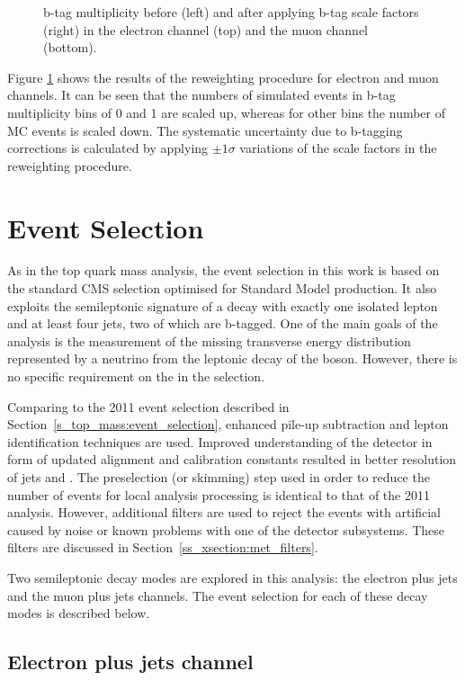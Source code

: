 \begin{figure}[!htpb]
	\caption{\label{fig:bjet_weights}
    b-tag multiplicity before (left) and after applying b-tag scale factors (right) in the electron channel (top) and
    the muon channel (bottom).}
\end{figure}

Figure \ref{fig:bjet_weights} shows the results of the reweighting procedure for electron and muon channels. It can be
seen that the numbers of simulated events in b-tag multiplicity bins of \num{0} and \num{1} are scaled up, whereas for
other bins the number of MC events is scaled down. The systematic uncertainty due to b-tagging corrections is calculated
by applying $\pm 1 \sigma$ variations of the scale factors in the reweighting procedure.

\section{Event Selection}
\label{s_xsection:event_selection}
As in the top quark mass analysis, the event selection in this work is based on the standard CMS selection optimised for
Standard Model \ttbar production. It also exploits the semileptonic signature of a \ttbar decay with exactly one
isolated lepton and at least four jets, two of which are b-tagged. One of the main goals of the analysis is the
measurement of the missing transverse energy distribution represented by a neutrino from the leptonic decay of the \W
boson. However, there is no specific requirement on the \MET in the selection.

Comparing to the 2011 event selection described in Section~\ref{s_top_mass:event_selection}, enhanced pile-up
subtraction and lepton identification techniques are used. Improved understanding of the detector in form of updated
alignment and calibration constants resulted in better resolution of jets and \MET. The preselection (or skimming) step
used in order to reduce the number of events for local analysis processing is identical to that of the 2011 analysis.
However, additional filters are used to reject the events with artificial \MET caused by noise or known problems with
one of the detector subsystems. These filters are discussed in Section~\ref{ss_xsection:met_filters}.

Two semileptonic \ttbar decay modes are explored in this analysis: the electron plus jets and the muon plus jets
channels. The event selection for each of these decay modes is described below.

\subsection{Electron plus jets channel}
\label{ss_xsection:ejets}

